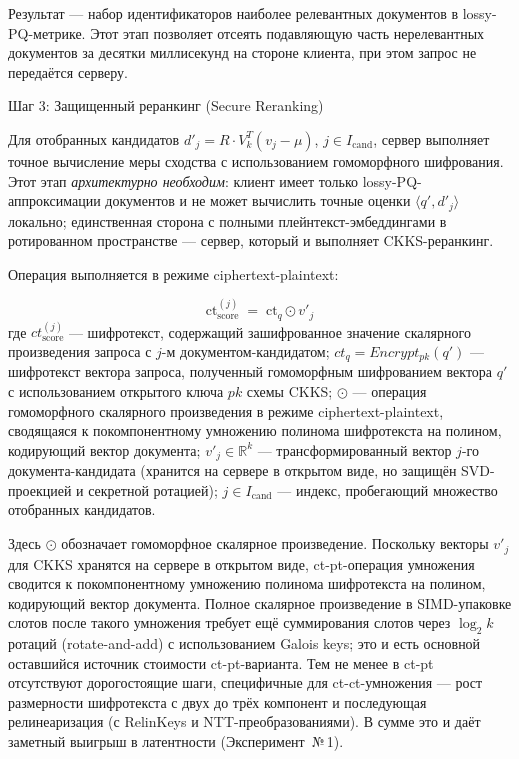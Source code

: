 \documentclass[a4paper, 12pt, oneside, openany]{article}
\begin{document}
Результат --- набор идентификаторов наиболее релевантных документов в lossy-PQ-метрике. Этот этап позволяет отсеять подавляющую часть нерелевантных документов за десятки миллисекунд на стороне клиента, при этом запрос не передаётся серверу.

Шаг 3: Защищенный реранкинг (Secure Reranking)

Для отобранных кандидатов \(d'_{j} = R \cdot V_k^{T}(v_j - \mu)\), $j \in I_{\mathrm{cand}}$, сервер выполняет точное вычисление меры сходства с использованием гомоморфного шифрования. Этот этап \emph{архитектурно необходим}: клиент имеет только lossy-PQ-аппроксимации документов и не может вычислить точные оценки $\langle q', d'_j \rangle$ локально; единственная сторона с полными плейнтекст-эмбеддингами в ротированном пространстве --- сервер, который и выполняет CKKS-реранкинг.

Операция выполняется в режиме ciphertext-plaintext:

\begin{equation}
	\mathrm{ct}_{\mathrm{score}}^{(j)} \;=\; \mathrm{ct}_{q} \odot v'_{j}
	\label{eq:4-6}
\end{equation}
где \(ct_{\mathrm{score}}^{(j)}\) --- шифротекст, содержащий зашифрованное значение скалярного произведения запроса с \(j\)-м документом-кандидатом; \(ct_{q} = Encrypt_{pk}(q')\) --- шифротекст вектора запроса, полученный гомоморфным шифрованием вектора \(q'\) с использованием открытого ключа \(pk\) схемы CKKS; \(\odot\) --- операция гомоморфного скалярного произведения в режиме ciphertext-plaintext, сводящаяся к покомпонентному умножению полинома шифротекста на полином, кодирующий вектор документа; \(v'_{j} \in \mathbb{R}^{k}\) --- трансформированный вектор \(j\)-го документа-кандидата (хранится на сервере в открытом виде, но защищён SVD-проекцией и секретной ротацией); \(j \in I_{\mathrm{cand}}\) --- индекс, пробегающий множество отобранных кандидатов.

Здесь $\odot$ обозначает гомоморфное скалярное произведение. Поскольку векторы $v'_j$ для CKKS хранятся на сервере в открытом виде, ct-pt-операция умножения сводится к покомпонентному умножению полинома шифротекста на полином, кодирующий вектор документа. Полное скалярное произведение в SIMD-упаковке слотов после такого умножения требует ещё суммирования слотов через $\log_2 k$ ротаций (rotate-and-add) с использованием Galois keys; это и есть основной оставшийся источник стоимости ct-pt-варианта. Тем не менее в ct-pt отсутствуют дорогостоящие шаги, специфичные для ct-ct-умножения --- рост размерности шифротекста с двух до трёх компонент и последующая релинеаризация (с RelinKeys и NTT-преобразованиями). В сумме это и даёт заметный выигрыш в латентности (Эксперимент~№\,1).
\end{document}
